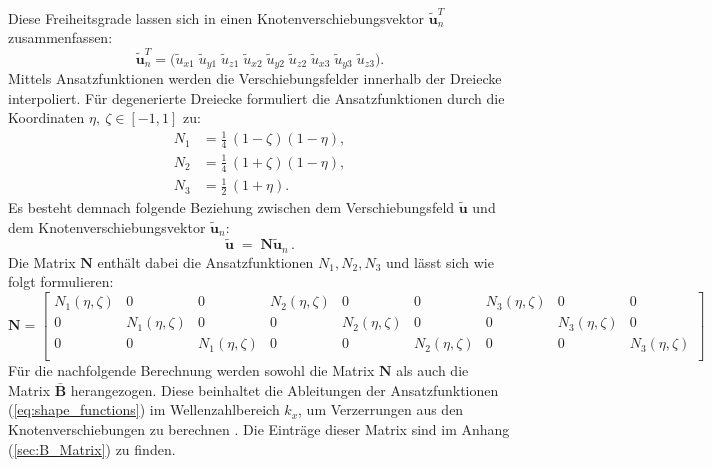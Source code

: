 Diese Freiheitsgrade lassen sich in einen Knotenverschiebungsvektor $\tilde{\mathbf u}_{n}^{T}$ zusammenfassen:
\begin{equation}\label{eq:un_rowvec}
	\tilde{\mathbf u}_{n}^{T}
	=\bigl(\tilde{u}_{x1}\; \tilde{u}_{y1}\; \tilde{u}_{z1}\; \tilde{u}_{x2}\; \tilde{u}_{y2}\; \tilde{u}_{z2}\;
	\tilde{u}_{x3}\; \tilde{u}_{y3}\; \tilde{u}_{z3}\bigr).
\end{equation}
Mittels Ansatzfunktionen werden die Verschiebungsfelder innerhalb der Dreiecke interpoliert. Für degenerierte Dreiecke formuliert \cite{Zienkiewicz2013} die Ansatzfunktionen durch die Koordinaten $\eta,\ \zeta \in [-1,1]$ zu:
\begin{subequations}\label{eq:shape_functions}
	\begin{align}
		N_1 &= \frac{1}{4}\,(1-\zeta)(1-\eta), \label{eq:shape_funcs_a}\\
		N_2 &= \frac{1}{4}\,(1+\zeta)(1-\eta), \label{eq:shape_funcs_b}\\
		N_3 &= \frac{1}{2}\,(1+\eta).        \label{eq:shape_funcs_c}
	\end{align}
\end{subequations}
Es besteht demnach folgende Beziehung zwischen dem Verschiebungsfeld $\tilde{\bm u}$ und dem Knotenverschiebungsvektor $\tilde{\bm u}_{n}$:
\begin{equation}\label{eq:u_interp}
	\tilde{\bm u} \;=\; \mathbf N \tilde{\bm u}_{n}\,.
\end{equation}
Die Matrix \(\mathbf{N}\) enthält dabei die Ansatzfunktionen $N_1, N_2, N_3$ und lässt sich wie folgt formulieren:
\begin{equation}\label{eq:N_matrix}
	\mathbf N =
	\begin{bmatrix}
		N_1(\eta,\zeta) & 0   & 0   & N_2(\eta,\zeta) & 0   & 0   & N_3(\eta,\zeta) & 0   & 0 \\[-2pt]
		0   & N_1(\eta,\zeta) & 0   & 0   & N_2(\eta,\zeta) & 0   & 0   & N_3(\eta,\zeta) & 0 \\[-2pt]
		0   & 0   & N_1(\eta,\zeta) & 0   & 0   & N_2(\eta,\zeta) & 0   & 0   & N_3(\eta,\zeta)\\[-2pt]
	\end{bmatrix}
\end{equation}
Für die nachfolgende Berechnung werden sowohl die Matrix \(\mathbf{N}\) als auch die Matrix \(\bar{\mathbf{B}}\) herangezogen. Diese beinhaltet die Ableitungen der Ansatzfunktionen (\ref{eq:shape_functions}) im Wellenzahlbereich $k_x$, um Verzerrungen aus den Knotenverschiebungen zu berechnen \citep{Hackenberg2016}.
Die Einträge dieser Matrix sind im Anhang (\ref{sec:B_Matrix}) zu finden.



